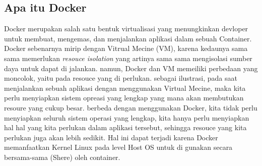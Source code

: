 \documentclass[11pt,a4paper]{article}
\begin{document}
\subsection*{Apa itu Docker}
Docker merupakan salah satu bentuk virtualisasi yang menungkinkan devloper untuk membuat, 
mengemas, dan menjalankan aplikasi dalam sebuah Container. Docker sebenarnya mirip dengan 
Vitrual Mecine (VM), karena kedaunya sama sama memerlukan \textit{resouce isolation} yang artinya
sama sama mengisolasi sumber daya untuk dapat di jalankan. namun, Docker dan VM memeiliki
perbedaan yang moncolok, yaitu pada resouce yang di perlukan. sebagai ilustrasi, pada saat 
menjalankan sebuah aplikasi dengan menggunakan Virtual Mecine, maka kita perlu menyiapkan 
sistem opreasi yang lengkap yang mana akan membutukan resoure yang cukup besar. berbeda dengan
menggunakan Docker, kita tidak perlu menyiapkan seluruh sistem operasi yang lengkap, kita hanya
perlu menyiapkan hal hal yang kita perlukan dalam aplikasi tersebut, sehingga resouce yang kita 
perlukan juga akan lebih sedikit. Hal ini dapat terjadi karena Docker memanfaatkan Kernel Linux
pada level Host OS untuk di gunakan secara bersama-sama (Shere) oleh container.
\end{document}
